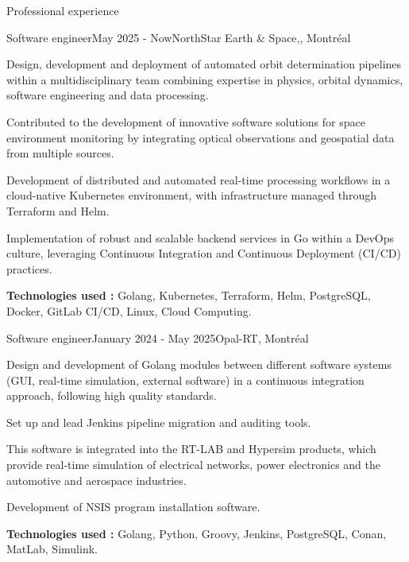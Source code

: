 \documentclass[
	10pt, %
]{resume}
\begin{document}

\begin{rSection}{Professional experience}

	\begin{rSubsection}{Software engineer}{May 2025 - Now}{NorthStar Earth \& Space,, Montréal}{}
		\item Design, development and deployment of automated orbit determination pipelines within a multidisciplinary team combining expertise in physics, orbital dynamics, software engineering and data processing.
		\item Contributed to the development of innovative software solutions for space environment monitoring by integrating optical observations and geospatial data from multiple sources.
		\item Development of distributed and automated real-time processing workflows in a cloud-native Kubernetes environment, with infrastructure managed through Terraform and Helm.
		\item Implementation of robust and scalable backend services in Go within a DevOps culture, leveraging Continuous Integration and Continuous Deployment (CI/CD) practices.
		\item \textbf{Technologies used : }Golang, Kubernetes, Terraform, Helm, PostgreSQL, Docker, GitLab CI/CD, Linux, Cloud Computing.
	\end{rSubsection}

	\begin{rSubsection}{Software engineer}{January 2024 - May 2025}{Opal-RT, Montréal}{}
		\item Design and development of Golang modules between different software systems (GUI, real-time simulation, external software) in a continuous integration approach, following high quality standards.
		\item Set up and lead Jenkins pipeline migration and auditing tools. 
		\item This software is integrated into the RT-LAB and Hypersim products, which provide real-time simulation of electrical networks, power electronics and the automotive and aerospace industries.
		\item Development of NSIS program installation software.
		\item \textbf{Technologies used : }Golang, Python, Groovy, Jenkins, PostgreSQL, Conan, MatLab, Simulink.
	\end{rSubsection}


\end{rSection}
\end{document}
